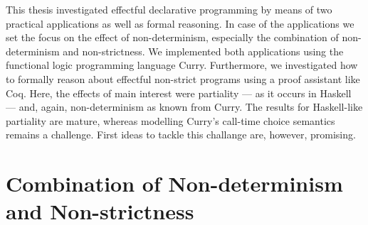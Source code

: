 %

This thesis investigated effectful declarative programming by means of two practical applications as well as formal reasoning.
In case of the applications we set the focus on the effect of non\--determinism, especially the combination of non\--determinism and non\--strictness.
We implemented both applications using the functional logic programming language Curry.
Furthermore, we investigated how to formally reason about effectful non\--strict programs using a proof assistant like Coq.
Here, the effects of main interest were partiality --- as it occurs in Haskell --- and, again, non\--determinism as known from Curry.
The results for Haskell\--like partiality are mature, whereas modelling Curry's call\--time choice semantics remains a challenge.
First ideas to tackle this challange are, however, promising.

\section{Combination of Non\--determinism and Non\--strictness}

